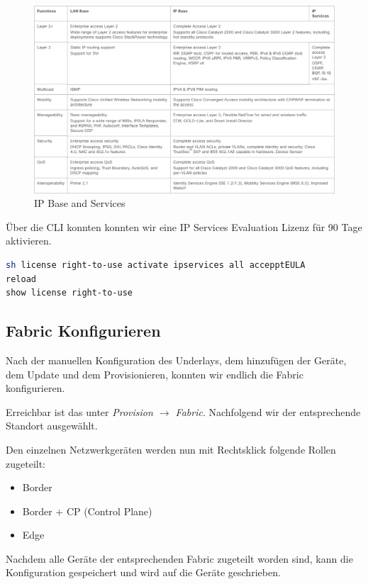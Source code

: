 \begin{figure}[H]
	\centering
	\includegraphics[width=16cm]{img/IPBaseServices.png}
	\caption{IP Base and Services}
	\label{fig:IP Base and Services}
\end{figure}

Über die CLI konnten konnten wir eine IP Services Evaluation Lizenz für 90 Tage aktivieren.

\begin{lstlisting}[language=bash]
sh license right-to-use activate ipservices all accepptEULA
reload
show license right-to-use
\end{lstlisting}

\subsection{Fabric Konfigurieren}
Nach der manuellen Konfiguration des Underlays, dem hinzufügen der Geräte, dem Update und dem Provisionieren, konnten wir endlich die Fabric konfigurieren. 

Erreichbar ist das unter \textit{Provision $\rightarrow$ Fabric}. Nachfolgend wir der entsprechende Standort ausgewählt.

Den einzelnen Netzwerkgeräten werden nun mit Rechtsklick folgende Rollen zugeteilt:
\begin{itemize}
	\item Border
	\item Border + CP (Control Plane)
	\item Edge
\end{itemize}

Nachdem alle Geräte der entsprechenden Fabric zugeteilt worden sind, kann die Konfiguration gespeichert und wird auf die Geräte geschrieben. 

